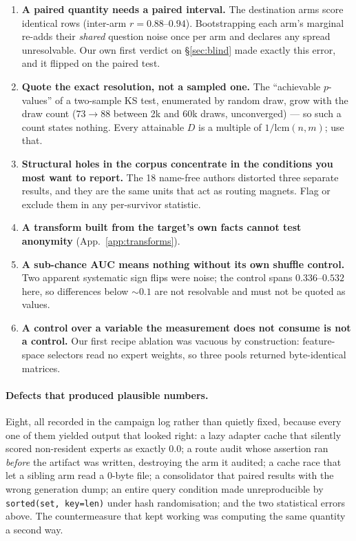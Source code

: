 \documentclass{article}
\begin{document}
\begin{enumerate}
  \item \textbf{A paired quantity needs a paired interval.} The destination arms score identical
        rows (inter-arm $r=0.88$--$0.94$). Bootstrapping each arm's marginal re-adds their
        \emph{shared} question noise once per arm and declares any spread unresolvable. Our own
        first verdict on \S\ref{sec:blind} made exactly this error, and it flipped on the paired
        test.
  \item \textbf{Quote the exact resolution, not a sampled one.} The ``achievable $p$-values'' of a
        two-sample KS test, enumerated by random draw, grow with the draw count ($73 \to 88$
        between 2k and 60k draws, unconverged) --- so such a count states nothing. Every attainable
        $D$ is a multiple of $1/\mathrm{lcm}(n,m)$; use that.
  \item \textbf{Structural holes in the corpus concentrate in the conditions you most want to
        report.} The 18 name-free authors distorted three separate results, and they are the same
        units that act as routing magnets. Flag or exclude them in any per-survivor statistic.
  \item \textbf{A transform built from the target's own facts cannot test anonymity}
        (App.~\ref{app:transforms}).
  \item \textbf{A sub-chance AUC means nothing without its own shuffle control.} Two apparent
        systematic sign flips were noise; the control spans $0.336$--$0.532$ here, so differences
        below ${\sim}0.1$ are not resolvable and must not be quoted as values.
  \item \textbf{A control over a variable the measurement does not consume is not a control.} Our
        first recipe ablation was vacuous by construction: feature-space selectors read no expert
        weights, so three pools returned byte-identical matrices.
\end{enumerate}

\paragraph{Defects that produced plausible numbers.} Eight, all recorded in the campaign log rather
than quietly fixed, because every one of them yielded output that looked right: a lazy adapter
cache that silently scored non-resident experts as exactly $0.0$; a route audit whose assertion ran
\emph{before} the artifact was written, destroying the arm it audited; a cache race that let a
sibling arm read a 0-byte file; a consolidator that paired results with the wrong generation dump;
an entire query condition made unreproducible by \texttt{sorted(set, key=len)} under hash
randomisation; and the two statistical errors above. The countermeasure that kept working was
computing the same quantity a second way.
\end{document}
